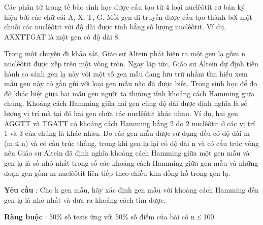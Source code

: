 Các phân tử trong tế bào sinh học được cấu tạo từ 4 loại nuclêôtit cơ bản ký hiệu bởi các chữ cái A, X, T, G. Mỗi gen di truyền được cấu tạo thành bởi một chuỗi các nuclêôtit với độ dài được tính bằng số lượng nuclêôtit. Ví dụ, AXXTTGAT là một gen có độ dài 8.





Trong một chuyến đi khảo sát, Giáo sư Altein phát hiện ra một gen lạ gồm n nuclêôtit được xếp trên một vòng tròn. Ngay lập tức, Giáo sư Altein dự định tiến hành so sánh gen lạ này với một số gen mẫu đang lưu trữ nhằm tìm hiểu xem mẫu gen này có gần gũi với loại gen mẫu nào đã được biết. Trong sinh học để đo độ khác biệt giữa hai mẫu gen người ta thường tính khoảng cách Hamming giữa chúng. Khoảng cách Hamming giữa hai gen cùng độ dài được định nghĩa là số lượng vị trí mà tại đó hai gen chứa các nuclêôtit khác nhau. Ví dụ, hai gen AGGTT và TGATT có khoảng cách Hamming bằng 2 do 2 nuclêôtit ở các vị trí 1 và 3 của chúng là khác nhau. Do các gen mẫu được sử dụng đều có độ dài m (m ≤ n) và có cấu trúc thẳng, trong khi gen lạ lại có độ dài n và có cấu trúc vòng nên Giáo sư Altein đã định nghĩa khoảng cách Hamming giữa một gen mẫu và gen lạ là số nhỏ nhất trong số các khoảng cách Hamming giữa gen mẫu và những đoạn gen gồm m nuclêôtit liên tiếp theo chiều kim đồng hồ trong gen lạ.





\textbf{Yêu cầu } : Cho k gen mẫu, hãy xác định gen mẫu với khoảng cách Hamming đến gen lạ là nhỏ nhất và đưa ra khoảng cách tìm được.

\textbf{Ràng buộc } : 50\% số tests ứng với 50\% số điểm của bài có n ≤ 100.
